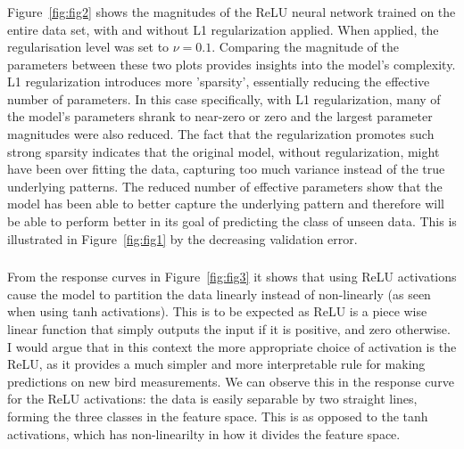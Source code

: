 \documentclass[12pt]{article}
\begin{document}
\newpage
\subsubsection{}
 Figure~\ref{fig:fig2} shows the magnitudes of the ReLU neural network trained on the entire data set, with and without L1 regularization applied. When applied, the regularisation level was set to \( \nu = 0.1 \). Comparing the magnitude of the parameters between these two plots provides insights into the model's complexity. L1 regularization introduces more 'sparsity', essentially reducing the effective number of parameters. In this case specifically, with L1 regularization, many of the model's parameters shrank to near-zero or zero and the largest parameter magnitudes were also reduced. The fact that the regularization promotes such strong sparsity indicates that the original model, without regularization, might have been over fitting the data, capturing too much variance instead of the true underlying patterns. The reduced number of effective parameters show that the model has been able to better capture the underlying pattern and therefore will be able to perform better in its goal of predicting the class of unseen data. This is illustrated in Figure~\ref{fig:fig1} by the decreasing validation error.

\subsubsection{}
From the response curves in Figure~\ref{fig:fig3} it shows that using ReLU activations cause the model to partition the data linearly instead of non-linearly (as seen when using tanh activations). This is to be expected as ReLU is a piece wise linear function that simply outputs the input if it is positive, and zero otherwise. I would argue that in this context the more appropriate choice of activation is the ReLU, as it provides a much simpler and more interpretable rule for making predictions on new bird measurements. We can observe this in the response curve for the ReLU activations: the data is easily separable by two straight lines, forming the three classes in the feature space. This is as opposed to the tanh activations, which has non-linearilty in how it divides the feature space.

\newpage 
\end{document}
